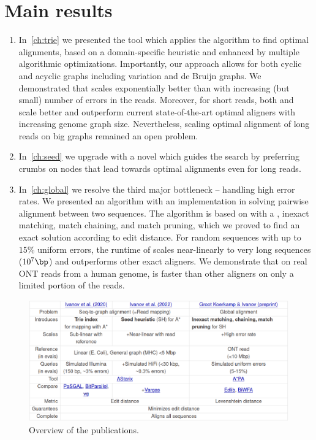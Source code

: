 \section*{Main results}

\begin{enumerate}
	\item In~\cref{ch:trie} we presented the tool \astarix which applies the \A
algorithm to find optimal alignments, based on a domain-specific heuristic and
enhanced by multiple algorithmic optimizations. Importantly, our approach allows
for both cyclic and acyclic graphs including variation and de Bruijn graphs. We
demonstrated that \astarix scales exponentially better than \dijkstra with
increasing (but small) number of errors in the reads. Moreover, for short reads,
both \astarix and \dijkstra scale better and outperform current state-of-the-art
optimal aligners with increasing genome graph size. Nevertheless, scaling
optimal alignment of long reads on big graphs remained an open problem.
	\item In~\cref{ch:seed} we upgrade \astarix with a novel \seedh which guides
the search by preferring crumbs on nodes that lead towards optimal alignments
even for long reads.
	\item In~\cref{ch:global} we resolve the third major bottleneck -- handling
high error rates. We presented an algorithm with an implementation in \astarpa
solving pairwise alignment between two sequences. The algorithm is based on \A
with a \sh, inexact matching, match chaining, and match pruning, which we proved
to find an exact solution according to edit distance. For random sequences with
up to $15\%$ uniform errors, the runtime of \astarpa scales near-linearly to
very long sequences ($10^7\bp$) and outperforms other exact aligners. We
demonstrate that on real ONT reads from a human genome, \astarpa is faster than
other aligners on only a limited portion of the reads.
\end{enumerate}

\begin{figure}[h]
  \includegraphics[width=1.0\linewidth]{media/ownpubs-table.png}
  \caption{Overview of the publications.}
  \label{tab:ownpubs}
\end{figure}

